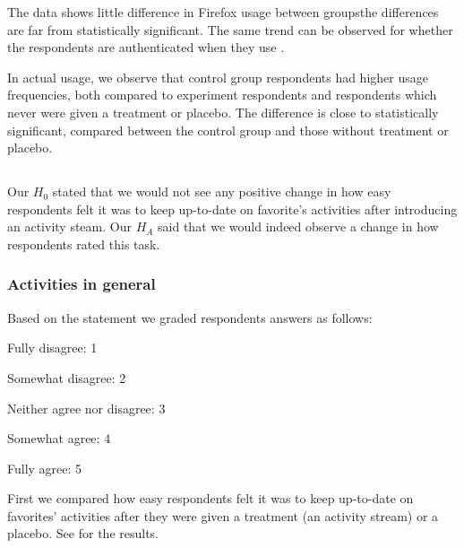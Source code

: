 The data shows little difference in Firefox usage between
groups\dash{}the differences are
far from statistically significant. The same trend can be observed for
whether the respondents are authenticated when they use \urort{}.

In actual \urort{} usage, we observe that control group respondents had
higher usage frequencies, both compared to experiment respondents and
respondents which never were given a treatment or placebo. The difference is
close to statistically significant, compared between the control group and
those without treatment or placebo.

\subsection{%
}

Our $H_0$ stated that we would not see any positive change in how easy
respondents felt it was to keep up-to-date on favorite's activities
after introducing an activity steam. Our $H_A$ said that we
would indeed observe a change in how respondents rated this task.

\subsubsection{Activities in general}

Based on the statement
 we graded respondents answers as follows: 

\begin{items}
  \item Fully disagree: 1
  \item Somewhat disagree: 2
  \item Neither agree nor disagree: 3
  \item Somewhat agree: 4
  \item Fully agree: 5
\end{items}

First we compared how easy respondents felt it was to keep up-to-date on
favorites' activities after they were given a treatment (an activity stream)
or a placebo.
See
 for the results.

